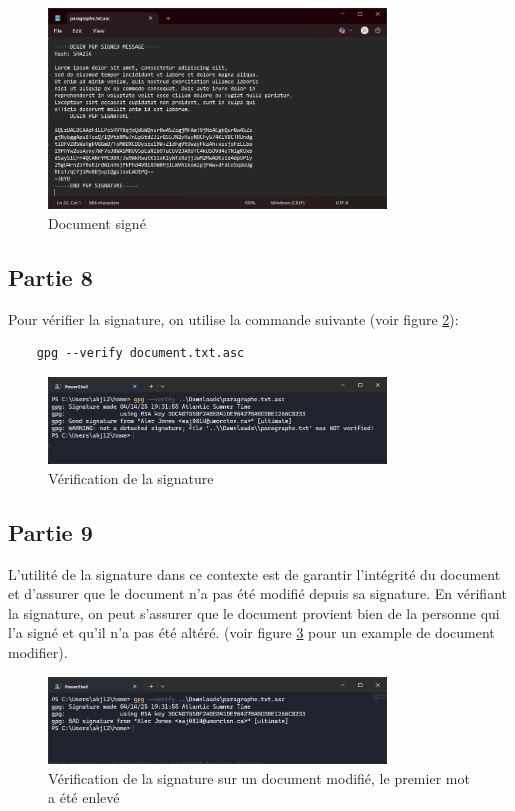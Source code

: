 \documentclass[12pt,a4paper]{article}
\begin{document}
\begin{figure}[ht]
    \centering
    \includegraphics[width=0.8\textwidth]{../img/sign.png}
    \caption{Document signé}
    \label{sign}
\end{figure}

\subsection{Partie 8}
Pour vérifier la signature, on utilise la commande suivante (voir figure \ref{verif}):
\begin{verbatim}
    gpg --verify document.txt.asc
\end{verbatim}

\begin{figure}[ht]
    \centering
    \includegraphics[width=0.8\textwidth]{../img/verif.png}
    \caption{Vérification de la signature}
    \label{verif}
\end{figure}

\subsection{Partie 9}
L'utilité de la signature dans ce contexte est de garantir l'intégrité du document et d'assurer que le document n'a pas été modifié depuis sa signature.
En vérifiant la signature, on peut s'assurer que le document provient bien de la personne qui l'a signé et qu'il n'a pas été altéré.
(voir figure \ref{verif_modif} pour un example de document modifier).

\begin{figure}[ht]
    \centering
    \includegraphics[width=0.8\textwidth]{../img/verif_modif.png}
    \caption{Vérification de la signature sur un document modifié, le premier mot a été enlevé}
    \label{verif_modif}
\end{figure}
\end{document}
